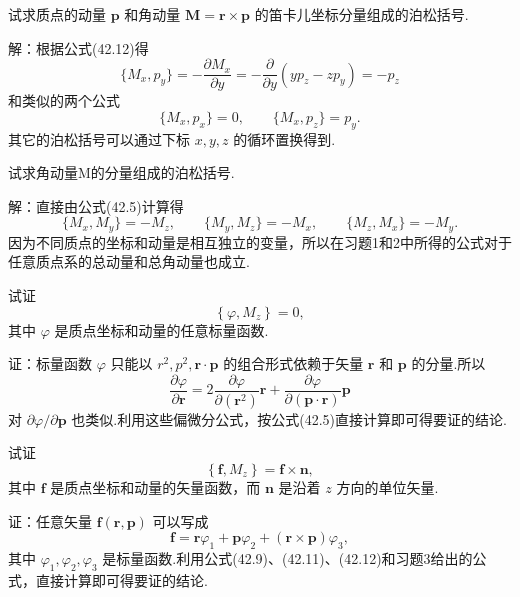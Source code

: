 \begin{xiti}

\quad 试求质点的动量 $\boldsymbol{p}$ 和角动量
$\boldsymbol{M}=\boldsymbol{r}\times\boldsymbol{p}$
的笛卡儿坐标分量组成的泊松括号.

解：根据公式(42.12)得
\begin{equation*}
  \{M_x,p_y\}=-\frac{\partial M_x}{\partial y}
  =-\frac{\partial}{\partial y}\left(yp_z-zp_y\right)=-p_z
\end{equation*}
和类似的两个公式
\begin{equation*}
  \{M_x,p_x\}=0,\qquad \{M_x,p_z\}=p_y.
\end{equation*}
其它的泊松括号可以通过下标 $x,y,z$ 的循环置换得到.

\quad 试求角动量M的分量组成的泊松括号.

解：直接由公式(42.5)计算得
\begin{equation*}
  \{M_x,M_y\}=-M_z,\qquad
  \{M_y,M_z\}=-M_x,\qquad
  \{M_z,M_x\}=-M_y.
\end{equation*}
因为不同质点的坐标和动量是相互独立的变量，所以在习题1和2中所得的公式对于任意质点系的总动量和总角动量也成立.

\quad 试证
\begin{equation*}
  \left\{\varphi,M_z\right\}=0,
\end{equation*}
其中 $\varphi$ 是质点坐标和动量的任意标量函数.

证：标量函数 $\varphi$ 只能以 $r^2,p^2,\boldsymbol{r}\cdot\boldsymbol{p}$
的组合形式依赖于矢量 $\boldsymbol{r}$ 和 $\boldsymbol{p}$ 的分量.所以
\begin{equation*}
  \frac{\partial\varphi}{\partial\boldsymbol{r}}
  =2\frac{\partial\varphi}{\partial\left(\boldsymbol{r}^2\right)}\boldsymbol{r}
  +\frac{\partial\varphi}{\partial\left(\boldsymbol{p}\cdot\boldsymbol{r}\right)}
  \boldsymbol{p}
\end{equation*}
对 $\partial\varphi/\partial\boldsymbol{p}$
也类似.利用这些偏微分公式，按公式(42.5)直接计算即可得要证的结论.

\quad 试证
\begin{equation*}
  \left\{\boldsymbol{f},M_z\right\}=\boldsymbol{f}\times\boldsymbol{n},
\end{equation*}
其中 $\boldsymbol{f}$ 是质点坐标和动量的矢量函数，而 $\boldsymbol{n}$
是沿着 $z$ 方向的单位矢量.

证：任意矢量 $\boldsymbol{f}(\boldsymbol{r},\boldsymbol{p})$ 可以写成
\begin{equation*}
  \boldsymbol{f}=\boldsymbol{r}\varphi_1+\boldsymbol{p}\varphi_2
  +\left(\boldsymbol{r}\times\boldsymbol{p}\right)\varphi_3,
\end{equation*}
其中 $\varphi_1,\varphi_2,\varphi_3$
是标量函数.利用公式(42.9)、(42.11)、(42.12)和习题3给出的公式，直接计算即可得要证的结论.

\end{xiti}

